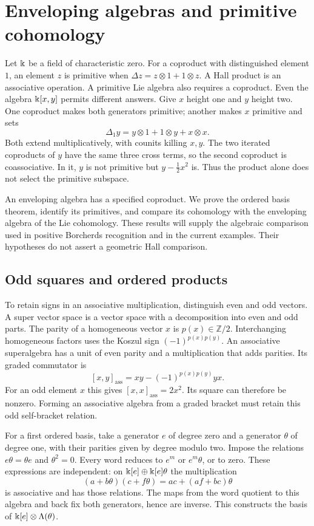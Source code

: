 \section{Enveloping algebras and primitive cohomology}
\label{sp:section}

Let $\Bbbk$ be a field of characteristic zero. For a coproduct with
distinguished element $1$, an element $z$ is primitive when
$\Delta z=z\otimes1+1\otimes z$.
A Hall product is an associative operation. A primitive Lie algebra
also requires a coproduct. Even the algebra $\Bbbk[x,y]$ permits different
answers. Give $x$ height one and $y$ height two. One coproduct makes
both generators primitive; another makes $x$ primitive and sets
\[
 \Delta_1y=y\otimes1+1\otimes y+x\otimes x.
\]
Both extend multiplicatively, with counits killing $x,y$.
The two iterated coproducts of $y$ have the same three cross terms,
so the second coproduct is coassociative. In it, $y$ is not primitive
but $y-\tfrac12x^2$ is. Thus the product alone does not select the
primitive subspace.

An enveloping algebra has a specified coproduct. We prove the ordered
basis theorem, identify its primitives, and compare its cohomology with
the enveloping algebra of the Lie cohomology. These results will supply
the algebraic comparison used in positive Borcherds recognition and in
the current examples. Their hypotheses do not assert a geometric Hall
comparison.

\subsection{Odd squares and ordered products}

To retain signs in an associative multiplication, distinguish even and
odd vectors.
A super vector space is a vector space with a decomposition into even
and odd parts.  The parity of a homogeneous vector $x$ is
$p(x)\in\mathbb Z/2$.  Interchanging homogeneous factors uses the
Koszul sign $(-1)^{p(x)p(y)}$.
An associative superalgebra has a unit of even parity and a multiplication
that adds parities.  Its graded commutator is
\[
 [x,y]_{\mathrm{ass}}=xy-(-1)^{p(x)p(y)}yx.
\]
For an odd element $x$ this gives $[x,x]_{\mathrm{ass}}=2x^2$.
Its square can therefore be nonzero.  Forming an associative algebra
from a graded bracket must retain this odd self-bracket relation.


For a first ordered basis, take a generator $e$ of degree zero and a generator
$\theta$ of degree one, with their parities given by degree modulo two.
Impose the relations $e\theta=\theta e$ and $\theta^2=0$.
Every word reduces to $e^m$ or $e^m\theta$, or to zero. These expressions
are independent: on $\Bbbk[e]\oplus\Bbbk[e]\theta$ the multiplication
\[
 (a+b\theta)(c+f\theta)=ac+(af+bc)\theta
\]
is associative and has those relations. The maps from the word quotient
to this algebra and back fix both generators, hence are inverse.
This constructs the basis of $\Bbbk[e]\otimes\Lambda(\theta)$.
\label{sp:even-odd-model}

